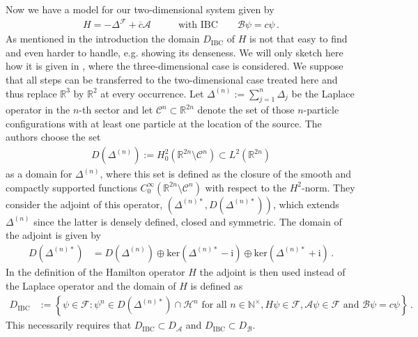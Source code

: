 Now we have a model for our two-dimensional system given by
\begin{align*}
  H
  =
  -
  \Delta^{\mathcal{F}}
  +
  \overline{c}
  \mathcal{A}
  \qquad
  &\text{with IBC}
  \qquad
  \mathcal{B}\psi
  =
  c
  \psi
  \,.
\end{align*}
As mentioned in the introduction the domain $D_{\textrm{IBC}}$ of $H$ is not that easy to find and even harder to handle, e.g. showing its denseness. We will only sketch here how it is given in \cite{7f9f7f95}, where the three-dimensional case is considered. We suppose that all steps can be transferred to the two-dimensional case treated here and thus replace $\mathbb{R}^{3}$ by $\mathbb{R}^{2}$ at every occurrence. Let $\Delta^{(n)} := \sum_{j = 1}^{n}\Delta_{j}$ be the Laplace operator in the $n$-th sector and let $\mathcal{C}^{n} \subset \mathbb{R}^{2n}$ denote the set of those $n$-particle configurations with at least one particle at the location of the source. The authors choose the set
\begin{align*}
  D(\Delta^{(n)})
  :=
  H_{0}^{2}
  \left(
    \mathbb{R}^{2n}
    \setminus
    \mathcal{C}^{n}
  \right)
  \subset
  L^{2}(\mathbb{R}^{2n})
\end{align*}
as a domain for $\Delta^{(n)}$, where this set is defined as the closure of the smooth and compactly supported functions $C_{0}^{\infty}(\mathbb{R}^{2n} \setminus \mathcal{C}^{n})$ with respect to the $H^{2}$-norm. They consider the adjoint of this operator, $(\Delta^{(n)\ast},D(\Delta^{(n)\ast}))$, which extends $\Delta^{(n)}$ since the latter is densely defined, closed and symmetric. The domain of the adjoint is given by
\begin{align*}
  D(\Delta^{(n)\ast})
  &=
  D(\Delta^{(n)})
  \oplus
  \mathrm{ker}
  \left(
    \Delta^{(n)\ast}
    -
    \mathrm{i}
  \right)
  \oplus
  \mathrm{ker}
  \left(
    \Delta^{(n)\ast}
    +
    \mathrm{i}
  \right)
  \,.
\end{align*}
In the definition of the Hamilton operator $H$ the adjoint is then used instead of the Laplace operator and the domain of $H$ is defined as
\begin{align*}
  D_{\textrm{IBC}}
  &:=
  \left\lbrace
    \psi
    \in
    \mathcal{F}
    \colon
    \psi^{n}
    \in
    D(\Delta^{(n)\ast})
    \cap
    \mathcal{H}^{n}
    \text{ for all }
    n
    \in
    \mathbb{N}^{\times}
    ,
    H
    \psi
    \in
    \mathcal{F}
    ,
    \mathcal{A}
    \psi
    \in
    \mathcal{F}
    \text{ and }
    \mathcal{B}
    \psi
    =
    c
    \psi
  \right\rbrace
  \,.
\end{align*}
This necessarily requires that $D_{\textrm{IBC}} \subset D_{\mathcal{A}}$ and $D_{\textrm{IBC}} \subset D_{\mathcal{B}}$.
